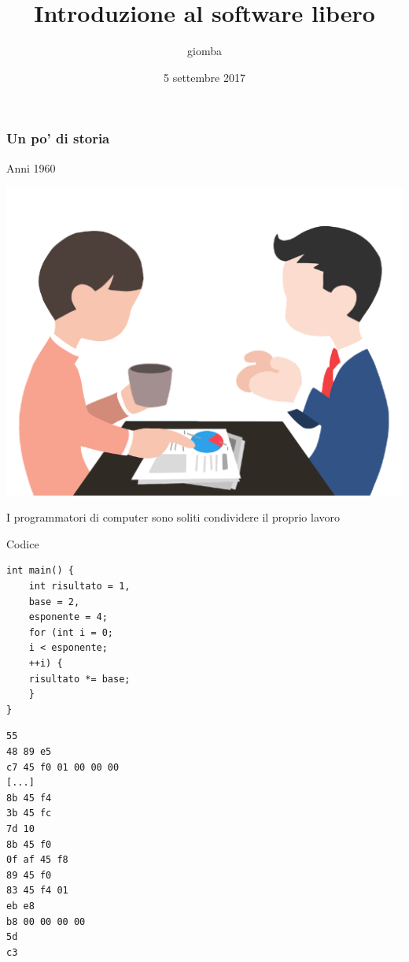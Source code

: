 \documentclass{beamer}
\title{Introduzione al software libero}
\author{giomba}
\date{5 settembre 2017}
\institute{GOLEM Empoli}
\begin{document}
\begin{frame}
  \maketitle
  \tableofcontents
\end{frame}

\begin{frame}[fragile]
\frametitle{Un po' di storia}

    \begin{block}{Anni 1960}
	\begin{minipage}{.15\linewidth}
	    \includegraphics[width=.9\linewidth]{img/meeting.png}
	\end{minipage}
    \begin{minipage}{.8\linewidth}
    I programmatori di computer sono soliti condividere il proprio lavoro
    \begin{exampleblock}{Codice}
    \begin{minipage}{.45\linewidth}
        \begin{Verbatim}[fontsize=\scriptsize]
int main() {
    int risultato = 1,
    base = 2,
    esponente = 4;
    for (int i = 0;
    i < esponente;
    ++i) {
    risultato *= base;
    }
}
        \end{Verbatim}
    \end{minipage}
    \begin{minipage}{.45\linewidth}
        \begin{Verbatim}[fontsize=\scriptsize]
55
48 89 e5
c7 45 f0 01 00 00 00
[...]
8b 45 f4
3b 45 fc
7d 10
8b 45 f0
0f af 45 f8
89 45 f0
83 45 f4 01
eb e8
b8 00 00 00 00
5d
c3
        \end{Verbatim}
    \end{minipage}
    \end{exampleblock}
    \end{minipage}
    \end{block}
\end{frame}
\end{document}
